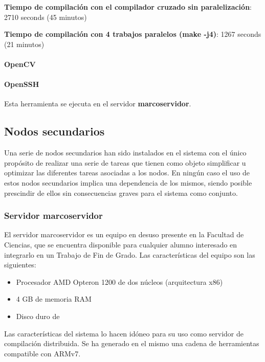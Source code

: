 \textbf{Tiempo de compilación con el compilador cruzado sin paralelización}: 2710 seconds (45 minutos)

\textbf{Tiempo de compilación con 4 trabajos paralelos (make -j4)}: 1267 seconds (21 minutos)

\paragraph{OpenCV}

\paragraph{OpenSSH}

Esta herramienta se ejecuta en el servidor \textbf{marcoservidor}.

\subsection{Nodos secundarios}

Una serie de nodos secundarios han sido instalados en el sistema con el único propósito de realizar una serie de tareas que tienen como objeto simplificar u optimizar las diferentes tareas asociadas a los nodos. En ningún caso el uso de estos nodos secundarios implica una dependencia de los mismos, siendo posible prescindir de ellos sin consecuencias graves para el sistema como conjunto.

\subsubsection{Servidor marcoservidor}

El servidor marcoservidor es un equipo en desuso presente en la Facultad de Ciencias, que se encuentra disponible para cualquier alumno interesado en integrarlo en un Trabajo de Fin de Grado. Las características del equipo son las siguientes:

\begin{itemize}
	\item Procesador AMD Opteron 1200 de dos núcleos (arquitectura x86)%
	\item 4 GB de memoria RAM
	\item Disco duro de %
\end{itemize}

Las características del sistema lo hacen idóneo para su uso como servidor de compilación distribuida. Se ha generado en el mismo una cadena de herramientas compatible con ARMv7.%

